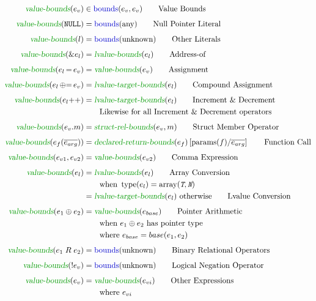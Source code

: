 \begin{figure}[ht]
\begin{align*}
  \vbounds(e_v) &\in \mbounds(e_v, e_v) \tag*{Value Bounds} \\[1ex]
  \vbounds(\mathtt{NULL}) &= \mbounds(\text{any}) \tag*{Null Pointer Literal} \\[1ex]
  \vbounds(l) &= \mbounds(\text{unknown}) \tag*{Other Literals} \\[1ex]
  \vbounds(\addrof e_l) &= \lbounds(e_l) \tag*{Address-of} \\[1ex]
  \vbounds(e_l \assign e_v) &= \vbounds(e_v) \tag*{Assignment} \\[1ex]
  \vbounds(e_l \compassign e_v) &= \ltbounds(e_l) \tag*{Compound Assignment} \\[1ex]
  \vbounds(e_l \inc) &= \ltbounds(e_l) \tag*{Increment \& Decrement} \\
                &\qquad \text{Likewise for all Increment \& Decrement operators} \\[1ex]
  \vbounds(e_v\member m) &= \srbounds(e_v, m) \tag*{Struct Member Operator} \\[1ex]
  \vbounds(e_f(\overline{e_{arg}})) &= \rbounds(e_f) \left[ \textrm{params}(f) \middle/ \overline{e_{arg}}\right] \tag*{Function Call}\\[1ex]
  \vbounds(e_{v1} , e_{v2}) &= \vbounds(e_{v2}) \tag*{Comma Expression} \\[1ex]
  \vbounds(e_l) &= \lbounds(e_l) \tag*{Array Conversion} \\
                &\qquad \text{when } \typeof(e_l) = \arr(\mv{T}, \mv{N}) \\
                &= \ltbounds(e_l) \text{ otherwise}
                  \tag*{Lvalue Conversion} \\[1ex]
  \vbounds(e_1 \binop e_2) &= \vbounds(e_{base}) \tag*{Pointer Arithmetic} \\
                &\qquad \text{when } e_1 \binop e_2 \text{ has pointer type} \\
                &\qquad \text{where } e_{base} = base(e_1, e_2) \\[1ex]
  \vbounds(e_1 \mathrel{R} e_2) &= \mbounds(\text{unknown}) \tag*{Binary Relational Operators} \\[1ex]
  \vbounds(! e_v) &= \mbounds(\text{unknown}) \tag*{Logical Negation Operator} \\[1ex]
  \vbounds(e_v) &= \vbounds(e_{vi}) \tag*{Other Expressions} \\
                &\qquad
                  \text{where } e_{vi}

\end{align*}
\end{figure}
